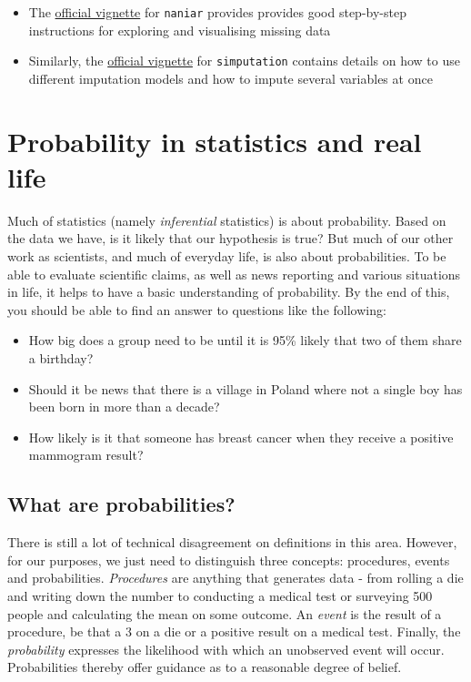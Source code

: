 \documentclass[
]{book}
\providecommand{\tightlist}{%
  \setlength{\itemsep}{0pt}\setlength{\parskip}{0pt}}
\begin{document}
\begin{itemize}
\tightlist
\item
  The \href{https://cran.r-project.org/web/packages/naniar/vignettes/getting-started-w-naniar.html}{official vignette} for \texttt{naniar} provides provides good step-by-step instructions for exploring and visualising missing data
\item
  Similarly, the \href{https://cran.r-project.org/web/packages/simputation/vignettes/intro.html}{official vignette} for \texttt{simputation} contains details on how to use different imputation models and how to impute several variables at once
\end{itemize}

\hypertarget{probability-in-statistics-and-real-life}{%
\chapter{Probability in statistics and real life}\label{probability-in-statistics-and-real-life}}

Much of statistics (namely \emph{inferential} statistics) is about probability. Based on the data we have, is it likely that our hypothesis is true? But much of our other work as scientists, and much of everyday life, is also about probabilities. To be able to evaluate scientific claims, as well as news reporting and various situations in life, it helps to have a basic understanding of probability. By the end of this, you should be able to find an answer to questions like the following:

\begin{itemize}
\tightlist
\item
  How big does a group need to be until it is 95\% likely that two of them share a birthday?
\item
  Should it be news that there is a village in Poland where not a single boy has been born in more than a decade?
\item
  How likely is it that someone has breast cancer when they receive a positive mammogram result?
\end{itemize}

\hypertarget{what-are-probabilities}{%
\section{What are probabilities?}\label{what-are-probabilities}}

There is still a lot of technical disagreement on definitions in this area. However, for our purposes, we just need to distinguish three concepts: procedures, events and probabilities. \emph{Procedures} are anything that generates data - from rolling a die and writing down the number to conducting a medical test or surveying 500 people and calculating the mean on some outcome. An \emph{event} is the result of a procedure, be that a 3 on a die or a positive result on a medical test. Finally, the \emph{probability} expresses the likelihood with which an unobserved event will occur. Probabilities thereby offer guidance as to a reasonable degree of belief.
\end{document}
